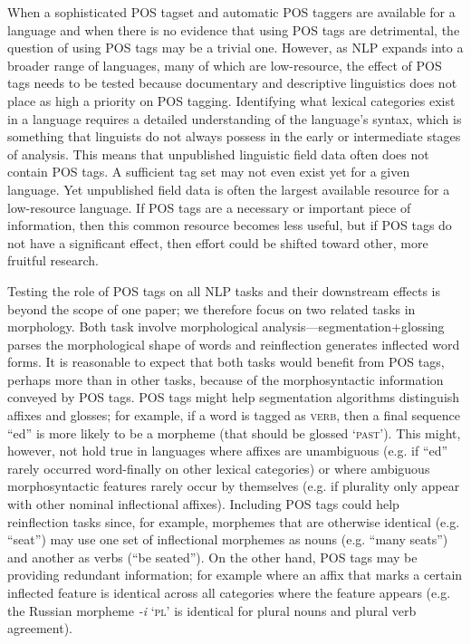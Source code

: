 When a sophisticated POS tagset and automatic POS taggers are available for a language and when there is no evidence that using POS tags are detrimental, the question of using POS tags may be a trivial one. However, as NLP expands into a broader range of languages, many of which are low-resource, the effect of POS tags needs to be tested because documentary and descriptive linguistics does not place as high a priority on POS tagging. Identifying what lexical categories exist in a language requires a detailed understanding of the language's syntax, which is something that linguists do not always possess in the early or intermediate stages of analysis. 
This means that unpublished linguistic field data often does not contain POS tags. A sufficient tag set may not even exist yet for a given language. Yet unpublished field data is often the largest available resource for a low-resource language. If POS tags are a necessary or important piece of information, then this common resource becomes less useful, but if POS tags do not have a significant effect, then effort could be shifted toward other, more fruitful research.

Testing the role of POS tags on all NLP tasks and their downstream effects is beyond the scope of one paper; we therefore focus on two related tasks in morphology. Both task involve morphological analysis---segmentation+glossing parses the morphological shape of words and reinflection generates inflected word forms. It is reasonable to expect that both tasks would benefit from POS tags, perhaps more than in other tasks, because of the morphosyntactic information conveyed by POS tags. POS tags might help segmentation algorithms distinguish affixes and glosses; for example, if a word is tagged as \textsc{verb}, then a final sequence ``ed'' is more likely to be a morpheme (that should be glossed `\textsc{past}'). This might, however, not hold true in languages where affixes are unambiguous (e.g. if ``ed'' rarely occurred word-finally on other lexical categories) or where ambiguous morphosyntactic features rarely occur by themselves (e.g. if plurality only appear with other nominal inflectional affixes).  Including POS tags could help reinflection tasks since, for example, morphemes that are otherwise identical (e.g. ``seat'') may use one set of inflectional morphemes as nouns (e.g. ``many seats'') and another as verbs (``be seated''). On the other hand, POS tags may be providing redundant information; for example where an affix that marks a certain inflected feature is identical across all categories where the feature appears (e.g. the Russian morpheme \textit{-i} `\textsc{pl}' is identical for plural nouns and plural verb agreement). 

